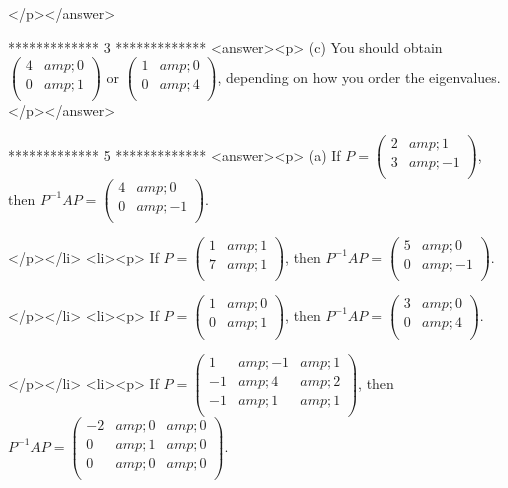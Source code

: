 </p></answer>


*************
3
*************
<answer><p> (c) You should obtain \(\left(
\begin{array}{cc}
 4 &amp; 0 \\
 0 &amp; 1 \\
\end{array}
\right)\) or \(\left(
\begin{array}{cc}
 1 &amp; 0 \\
 0 &amp; 4 \\
\end{array}
\right)\), depending on how you order the eigenvalues.</p></answer>


*************
5
*************
<answer><p> (a)  If  \(P=\left(
\begin{array}{cc}
 2 &amp; 1 \\
 3 &amp; -1 \\
\end{array}
\right)\), then \(P^{-1}A P=\left(
\begin{array}{cc}
 4 &amp; 0 \\
 0 &amp; -1 \\
\end{array}
\right)\).

</p></li>
<li><p> If  \(P=\left(
\begin{array}{cc}
 1 &amp; 1 \\
 7 &amp; 1 \\
\end{array}
\right)\), then \(P^{-1}A P=\left(
\begin{array}{cc}
 5 &amp; 0 \\
 0 &amp; -1 \\
\end{array}
\right)\).

</p></li>
<li><p> If  \(P=\left(
\begin{array}{cc}
 1 &amp; 0 \\
 0 &amp; 1 \\
\end{array}
\right)\), then \(P^{-1}A P=\left(
\begin{array}{cc}
 3 &amp; 0 \\
 0 &amp; 4 \\
\end{array}
\right)\).

</p></li>
<li><p> If  \(P=\left(
\begin{array}{ccc}
 1 &amp; -1 &amp; 1 \\
 -1 &amp; 4 &amp; 2 \\
 -1 &amp; 1 &amp; 1 \\
\end{array}
\right)\), then \(P^{-1}A P=\left(
\begin{array}{ccc}
 -2 &amp; 0 &amp; 0 \\
 0 &amp; 1 &amp; 0 \\
 0 &amp; 0 &amp; 0 \\
\end{array}
\right)\).

